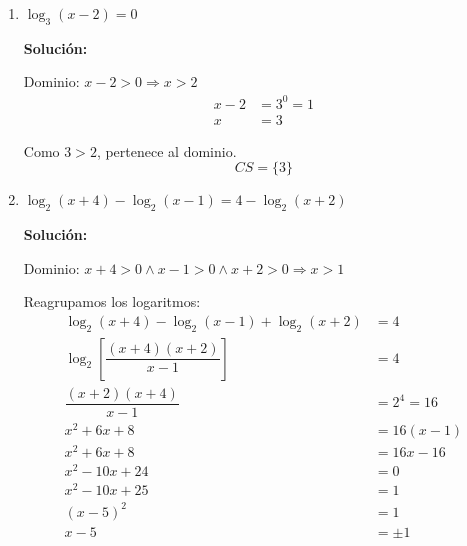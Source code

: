 \documentclass[12pt]{article}
\newcommand{\solucion}{%
    \vspace{0.8em}%
    \textbf{Solución:}%
}
\begin{document}
\begin{enumerate}[label=\alph*.-]
    \solucion

    Reescribimos $4^x = (2^x)^2$ y reorganizamos:
    \[
    2^x - (2^x)^2 + 10 = -2 \Rightarrow -(2^x)^2 + 2^x + 12 = 0
    \]

    Sea $y = 2^x$, con $y > 0$:
    \begin{align*}
    -y^2 + y + 12 &= 0 \\[0.3em]
    y^2 - y - 12 &= 0 \\[0.3em]
    (y - 4)(y + 3) &= 0 \Rightarrow
    \begin{cases} y = 4 \\ y = -3 \end{cases}
    \end{align*}

    Como $y = 2^x > 0$, descartamos $y = -3$. Luego:
    \begin{align*}
    2^x &= 4 = 2^2 \Rightarrow x = 2
    \end{align*}
    \[
    \boxed{CS = \{2\}}
    \]

    \newpage
    \item $\log_3(x - 2) = 0$

    \solucion

    Dominio: $x - 2 > 0 \Rightarrow x > 2$
    \begin{align*}
    x - 2 &= 3^0 = 1 \\[0.3em]
    x &= 3
    \end{align*}

    Como $3 > 2$, pertenece al dominio.
    \[
    \boxed{CS = \{3\}}
    \]

    \item $\log_2(x+4) - \log_2(x-1) = 4 - \log_2(x+2)$

    \solucion

    Dominio: $x + 4 > 0 \land x - 1 > 0 \land x + 2 > 0 \Rightarrow x > 1$

    Reagrupamos los logaritmos:
    \begin{align*}
    \log_2(x+4) - \log_2(x-1) + \log_2(x+2) &= 4 \\[0.3em]
    \log_2\left[\dfrac{(x+4)(x+2)}{x-1}\right] &= 4 \\[0.3em]
    \dfrac{(x+2)(x+4)}{x-1} &= 2^4 = 16 \\[0.3em]
    x^2 + 6x + 8 &= 16(x-1) \\[0.3em]
    x^2 + 6x + 8 &= 16x - 16 \\[0.3em]
    x^2 - 10x + 24 &= 0 \\[0.3em]
    x^2 - 10x + 25 &= 1 \\[0.3em]
    (x-5)^2 &= 1 \\[0.3em]
    x - 5 &= \pm 1
    \end{align*}


\end{enumerate}
\end{document}
